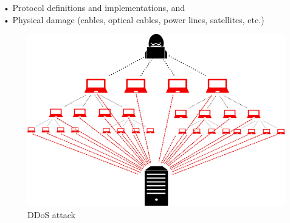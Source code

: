 • Protocol definitions and implementations, and \\
• Physical damage (cables, optical cables, power lines, satellites, etc.) \cite{ozccelik2020distributed}
\newpage
\begin{figure}[!htb]
    \centering
    \includegraphics[scale=0.6]{thesis/ddos.png}
    \caption{DDoS attack}
    \label{fig:enter-label}
\end{figure}
